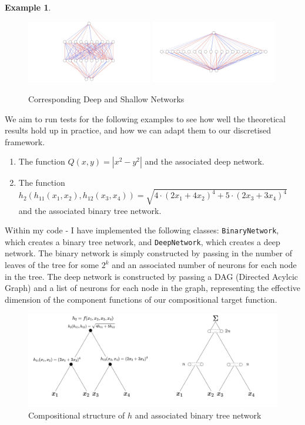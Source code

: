 \documentclass[11pt,a4paper]{article}
\theoremstyle{plain}
\theoremstyle{definition}
\newtheorem{example}[theorem]{Example}
\theoremstyle{remark}
\begin{document}
\begin{example}
    \begin{figure}[h]
        \centering
        \includegraphics[width=0.49\textwidth]{diags/DeepQ.png}
        \includegraphics[width=0.49\textwidth]{diags/ShallowQ.png}
        \caption{Corresponding Deep and Shallow Networks}
    \end{figure}
    
\end{example}

We aim to run tests for the following examples to see how well the theoretical results hold up in practice, and how we can adapt them to our discretised framework.

\begin{enumerate}
    \item The function $Q(x, y) = |x^{2}  - y^{2}|$ and the associated deep network.
    \item The function $h_2(h_{11}(x_1,x_2), h_{12}(x_3,x_4)) = \sqrt{4 \cdot (2x_1 + 4x_2)^4 + 5 \cdot (2x_3 + 3x_4)^4}$ and the associated binary tree network.
\end{enumerate}

Within my code - I have implemented the following classes: \verb|BinaryNetwork|, which creates a binary tree network, and \verb|DeepNetwork|, which creates a deep network.
The binary network is simply constructed by passing in the number of leaves of the tree for some \(2^k\) and an associated number of neurons for each node in the tree. 
The deep network is constructed by passing a DAG (Directed Acylcic Graph) and a list of neurons for each node in the graph, representing the effective dimension of the component functions of our compositional target function.

\begin{figure}[h]
    \centering
    \includegraphics[width=\textwidth]{diags/BinaryTree.png}
    \caption{Compositional structure of \(h\) and associated binary tree network}
    \label{fig:}
\end{figure}
\end{document}
